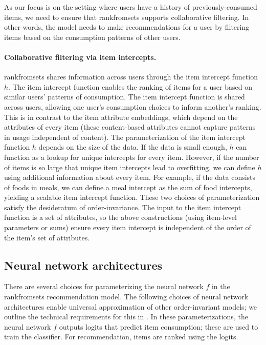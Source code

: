 As our focus is on the setting where users have a history of previously-consumed
items, we need to ensure that \acrshort{rankfromsets} supports collaborative
filtering. In other words, the model needs to make recommendations for a user by
filtering items based on the consumption patterns of other users.

\paragraph{Collaborative filtering via item intercepts.}
\acrshort{rankfromsets} shares information across users through the item
intercept function $h$. The item intercept function enables the ranking of items
for a user based on similar users' patterns of consumption. The item intercept
function is shared across users, allowing one user's consumption choices to
inform another's ranking. This is in contrast to the item attribute embeddings,
which depend on the attributes of every item (these content-based attributes
cannot capture patterns in usage independent of content). The parameterization
of the item intercept function $h$ depends on the size of the data. If the data
is small enough, $h$ can function as a lookup for unique intercepts for every
item. However, if the number of items is so large that unique item intercepts
lead to overfitting, we can define $h$ using additional information about every
item. For example, if the data consists of foods in meals, we can define a meal
intercept as the sum of food intercepts, yielding a scalable item intercept
function. These two choices of parameterization satisfy the desideratum of
order-invariance. The input to the item intercept function is a set of
attributes, so the above constructions (using item-level parameters or sums)
ensure every item intercept is independent of the order of the item's set of
attributes.

\subsection{Neural network architectures}
\label{sec:parameterizations}
There are several choices for parameterizing the neural network $f$ in the
\acrshort{rankfromsets} recommendation model. The following choices of neural
network architectures enable universal approximation of other order-invariant
models; we outline the technical requirements for this in . In
these parameterizations, the neural network $f$ outputs logits that predict item
consumption; these are used to train the classifier. For recommendation, items
are ranked using the logits.

